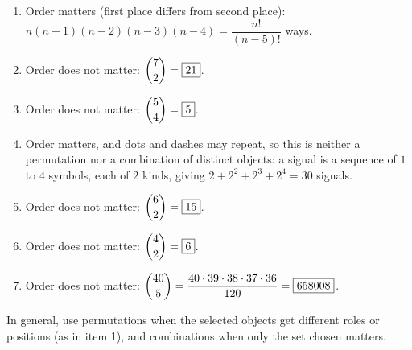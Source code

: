 \begin{enumerate}
\item[1.] Order matters (first place differs from second place): $n(n-1)(n-2)(n-3)(n-4)=\boxed{\dfrac{n!}{(n-5)!}}$ ways.
\item[3.] Order does not matter: $\dbinom72=\boxed{21}$.
\item[4.] Order does not matter: $\dbinom54=\boxed{5}$.
\item[6.] Order matters, and dots and dashes may repeat, so this is neither a permutation nor a combination of distinct objects: a signal is a sequence of $1$ to $4$ symbols, each of $2$ kinds, giving $2+2^2+2^3+2^4=\boxed{30}$ signals.
\item[7.] Order does not matter: $\dbinom62=\boxed{15}$.
\item[9.] Order does not matter: $\dbinom42=\boxed{6}$.
\item[10.] Order does not matter: $\dbinom{40}{5}=\dfrac{40\cdot39\cdot38\cdot37\cdot36}{120}=\boxed{658008}$.
\end{enumerate}
In general, use permutations when the selected objects get different roles or positions (as in item 1), and combinations when only the set chosen matters.
